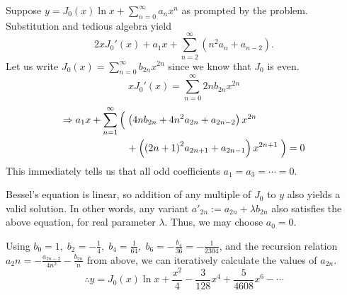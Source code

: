 \item
Suppose $y = J_0(x) \ln x + \sum_{n=0}^\infty a_n x^n$ as prompted by the problem.
Substitution and tedious algebra yield
\[
	2xJ_0'(x) + a_1 x + \sum_{n=2}^\infty (n^2 a_n + a_{n - 2}).
\]
Let us write $J_0(x) = \sum_{n=0}^\infty b_{2n} x^{2n}$ since we know that $J_0$ is even.
\[
	xJ_0'(x) = \sum_{n=0}^\infty 2nb_{2n}x^{2n}
\]
\begin{align*}
	\Rightarrow a_1 x +
	\sum_{n=1}^\infty
	\left( \vphantom{\left( {(x)}^2\right)} \right.
		& \left( 4nb_{2n} + 4n^2 a_{2n} + a_{2n -2} \right) x^{2n} \\
		&+ \left( {(2n + 1)}^2 a_{2n + 1} + a_{2n - 1} \right) x^{2n + 1}
	\left. \vphantom{\left( {(x)}^2\right)} \right) = 0
\end{align*}
This immediately tells us that all odd coefficients $a_1 = a_3 = \cdots = 0$.

Bessel's equation is linear, so addition of any multiple of $J_0$ to $y$ also yields a valid solution.
In other words, any variant $a'_{2n} := a_{2n} + \lambda b_{2n}$ also satisfies the above equation, for real parameter $\lambda$.
Thus, we may choose $a_0 = 0$.

Using $b_0 = 1,\; b_2 = -\frac{1}{4},\; b_4 = \frac{1}{64},\; b_6 = -\frac{b_4}{36} = -\frac{1}{2304}$,
and the recursion relation $a_2n = - \frac{a_{2n - 2}}{4n^2} - \frac{b_{2n}}{n}$ from above,
we can iteratively calculate the values of $a_{2n}$.
\[
	\therefore y = J_0(x)\ln x + \frac{x^2}{4} - \frac{3}{128}x^4 + \frac{5}{4608} x^6 - \cdots
\]